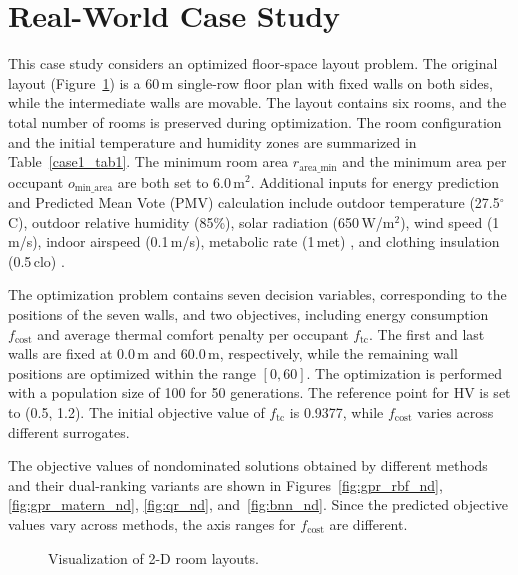 \documentclass{article}
\begin{document}
\section{Real-World Case Study}
This case study \cite{building_opt2} considers an optimized floor-space layout problem. The original layout (Figure~\ref{fig_case1_results}) is a 60\,m single-row floor plan with fixed walls on both sides, while the intermediate walls are movable. The layout contains six rooms, and the total number of rooms is preserved during optimization. The room configuration and the initial temperature and humidity zones are summarized in Table~\ref{case1_tab1}. The minimum room area $r_{\text{area\_min}}$ and the minimum area per occupant $o_\text{min\_area}$ are both set to 6.0\,m$^2$. Additional inputs for energy prediction and Predicted Mean Vote (PMV) calculation include outdoor temperature (27.5$^\circ$C), outdoor relative humidity (85\%), solar radiation (650\,W/m$^2$), wind speed (1\,m/s), indoor airspeed (0.1\,m/s), metabolic rate (1\,met) \cite{metabolic_rate}, and clothing insulation (0.5\,clo) \cite{thermal-comfort-pmv}. 

The optimization problem contains seven decision variables, corresponding to the positions of the seven walls, and two objectives, including energy consumption $f_{\text{cost}}$ and average thermal comfort penalty per occupant $f_{\text{tc}}$. The first and last walls are fixed at 0.0\,m and 60.0\,m, respectively, while the remaining wall positions are optimized within the range $[0,60]$. The optimization is performed with a population size of 100 for 50 generations. The reference point for HV is set to (0.5, 1.2). The initial objective value of $f_{\text{tc}}$ is 0.9377, while $f_{\text{cost}}$ varies across different surrogates. 

The objective values of nondominated solutions obtained by different methods and their dual-ranking variants are shown in Figures~\ref{fig:gpr_rbf_nd}, \ref{fig:gpr_matern_nd}, \ref{fig:qr_nd}, and~\ref{fig:bnn_nd}. Since the predicted objective values vary across methods, the axis ranges for $f_{\text{cost}}$ are different.

\begin{figure}[htbp]
    \centering
    
    \caption{Visualization of 2-D room layouts.}
    \label{fig_case1_results}
\end{figure}
\end{document}
